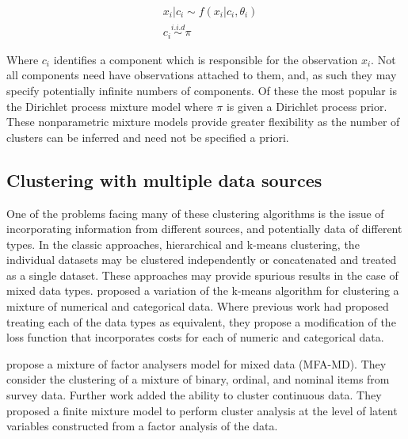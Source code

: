 \documentclass[10pt,a4paper]{article}
\begin{document}
\begin{equation}
\begin{split}
& x_i|c_i \sim f(x_i|c_i, \theta_i) \\
& c_i \overset{i.i.d}{\sim} \pi
\end{split}
\end{equation}

\noindent Where $c_i$ identifies a component which is responsible for the observation $x_i$. Not all components need have observations attached to them, and, as such they may specify potentially infinite numbers of components. Of these the most popular is the Dirichlet process mixture model \cite{escobar1995bayesian} where $\pi$ is given a Dirichlet process prior. These nonparametric mixture models provide greater flexibility as the number of clusters can be inferred and need not be specified a priori. 

\subsection{Clustering with multiple data sources}
One of the problems facing many of these clustering algorithms is the issue of incorporating information from different sources, and potentially data of different types. In the classic approaches, hierarchical and k-means clustering, the individual datasets may be clustered independently or concatenated and treated as a single dataset. These approaches may provide spurious results in the case of mixed data types.  proposed a variation of the k-means algorithm for clustering a mixture of numerical and categorical data. Where previous work had proposed treating each of the data types as equivalent, they propose a modification of the loss function that incorporates costs for each of numeric and categorical data.

 propose a mixture of factor analysers model for mixed data (MFA-MD). They consider the clustering of a mixture of binary, ordinal, and nominal items from survey data. Further work\cite{mcparland2016clustering} added the ability to cluster continuous data. They proposed a finite mixture model to perform cluster analysis at the level of latent variables constructed from a factor analysis of the data. 
\end{document}
